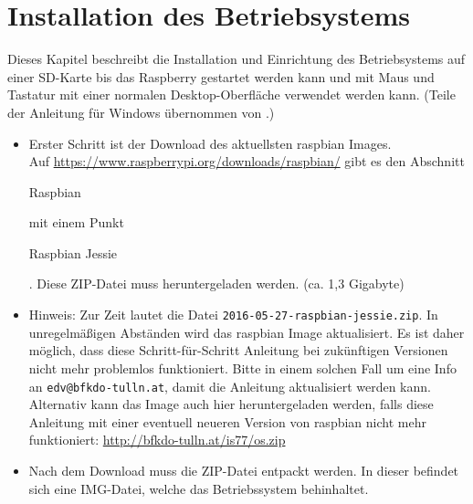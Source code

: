 \label{sec:schritte}

\section{Installation des Betriebsystems}
\label{sec:stepsinstall}
Dieses Kapitel beschreibt die Installation und Einrichtung des Betriebsystems auf einer SD-Karte bis das Raspberry gestartet werden kann und mit Maus und Tastatur mit einer normalen Desktop-Oberfläche verwendet werden kann. (Teile der Anleitung für Windows übernommen von \cite{install}.)

\begin{itemize}
	\item {Erster Schritt ist der Download des aktuellsten raspbian Images.\\
		Auf \url{https://www.raspberrypi.org/downloads/raspbian/} gibt es den Abschnitt \begin{em}Raspbian\end{em} mit einem Punkt \begin{em}Raspbian Jessie\end{em}. 
		Diese ZIP-Datei muss heruntergeladen werden.
		(ca. 1,3 Gigabyte)
		}
	\item {Hinweis: Zur Zeit lautet die Datei \lstinline|2016-05-27-raspbian-jessie.zip|.
		In unregelmäßigen Abständen wird das raspbian Image aktualisiert.
		Es ist daher möglich, dass diese Schritt-für-Schritt Anleitung bei zukünftigen Versionen nicht mehr problemlos funktioniert.
		Bitte in einem solchen Fall um eine Info an \verb|edv@bfkdo-tulln.at|, damit die Anleitung aktualisiert werden kann.\\
		Alternativ kann das Image auch hier heruntergeladen werden, falls diese Anleitung mit einer eventuell neueren Version von raspbian nicht mehr funktioniert: \url{http://bfkdo-tulln.at/is77/os.zip}
		}
	\item {Nach dem Download muss die ZIP-Datei entpackt werden. In dieser befindet sich eine IMG-Datei, welche das Betriebssystem behinhaltet.}

\end{itemize}
